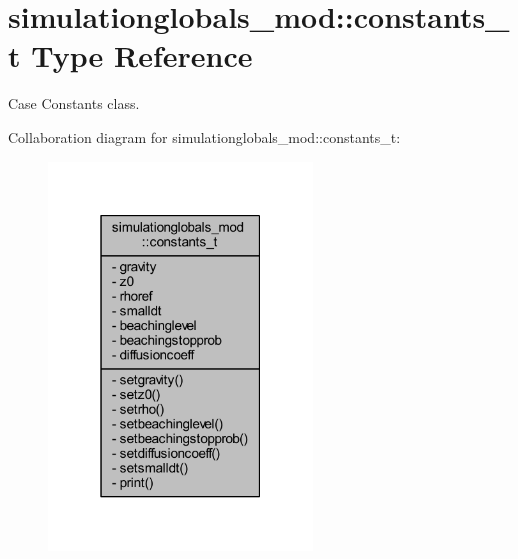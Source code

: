 \hypertarget{structsimulationglobals__mod_1_1constants__t}{}\section{simulationglobals\+\_\+mod\+:\+:constants\+\_\+t Type Reference}
\label{structsimulationglobals__mod_1_1constants__t}


Case Constants class.  




Collaboration diagram for simulationglobals\+\_\+mod\+:\+:constants\+\_\+t\+:\nopagebreak
\begin{figure}[H]
\begin{center}
\leavevmode
\includegraphics[width=199pt]{structsimulationglobals__mod_1_1constants__t__coll__graph}
\end{center}
\end{figure}

